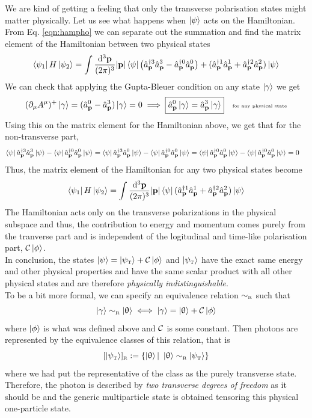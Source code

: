 We are kind of getting a feeling that only the transverse polarisation states might matter physically. Let us see what happens when $\ket{\psi}$ acts on the Hamiltonian. 
From Eq. \ref{eqn:hampho} we can separate out the summation and find the matrix element of the Hamiltonian between two physical states
\begin{align*}
    \bra{\psi_1} H\ket{\psi_2} = \int \frac{\dd^3\vb{{\vb{p}}}}{(2\pi)^3}|\vb{p}| \bra{\psi}{\qty(\hat{a}_{\vb{p}}^{\dagger3} \hat{a}_{\vb{p}}^{3} -\hat{a}_{\vb{p}}^{\dagger0} \hat{a}_{\vb{p}}^{0} ) +(\hat{a}_{\vb{p}}^{\dagger1} \hat{a}_{\vb{p}}^{1}+\hat{a}_{\vb{p}}^{\dagger2} \hat{a}_{\vb{p}}^{2})}\ket{\psi}
\end{align*} 
We can check that applying the Gupta-Bleuer condition on any state $\ket{\gamma}$ we get
$$(\partial_\mu A^\mu)^+ \ket{\gamma} = (\hat{a}_{\vb{p}}^{0} -\hat{a}_{\vb{p}}^{3} )\ket{\gamma} =0\implies \boxed{\hat{a}_{\vb{p}}^{0}\ket{\gamma } = \hat{a}_{\vb{p}}^{3}\ket{\gamma}} \quad \text{\tiny for any physical state}$$
Using this on the matrix element for the Hamiltonian above, we get that for the non-transverse part,
\begin{align*}
    \bra{\psi} \hat{a}_{\vb{p}}^{\dagger3} \hat{a}_{\vb{p}}^{3}\ket{\psi} -\bra{\psi}\hat{a}_{\vb{p}}^{\dagger0} \hat{a}_{\vb{p}}^{0}\ket{\psi} &= \bra{\psi} \hat{a}_{\vb{p}}^{\dagger3} \hat{a}_{\vb{p}}^{0}\ket{\psi} -\bra{\psi}\hat{a}_{\vb{p}}^{\dagger0} \hat{a}_{\vb{p}}^{0}\ket{\psi} = \bra{\psi} \hat{a}_{\vb{p}}^{\dagger0} \hat{a}_{\vb{p}}^{0}\ket{\psi} -\bra{\psi}\hat{a}_{\vb{p}}^{\dagger0} \hat{a}_{\vb{p}}^{0}\ket{\psi} =0
\end{align*}
Thus, the matrix element of the Hamiltonian for any two physical states become
$$\bra{\psi_1} H\ket{\psi_2} = \int \frac{\dd^3\vb{{\vb{p}}}}{(2\pi)^3}|\vb{p}| \bra{\psi}{ (\hat{a}_{\vb{p}}^{\dagger1} \hat{a}_{\vb{p}}^{1}+\hat{a}_{\vb{p}}^{\dagger2} \hat{a}_{\vb{p}}^{2})}\ket{\psi}$$
The Hamiltonian acts only on the transverse polarizations in the physical subspace and thus, the contribution to energy and momentum comes purely from the tranverse part and is independent of the logitudinal and time-like polarisation part, $\mathcal C \ket{\phi}$.\\[0.2cm]
In conclusion, the states $\ket{\psi} =\ket{\psi_{\text{\tiny T}}} + \mathcal C \ket{\phi}$ and $\ket{\psi_{\text{\tiny T}}}$ have the exact same energy and other physical properties and have the same scalar product with all other physical states and are therefore \textit{physically indistinguishable}. \\[0.2cm]
To be a bit more formal, we can specify an equivalence relation $\sim_{\text{\tiny R}}$ such that 
$$\ket{\gamma}\sim_{\text{\tiny R}} \ket{\uptheta} \iff \ket{\gamma} = \ket{\uptheta}+ \mathcal C\ket{\phi}$$
where $\ket{\phi}$ is what was defined above and $\mathcal C$ is some constant. Then photons are represented by the equivalence classes of this relation, that is
$$[\ket{\psi_{\text{\tiny T}}}]_{\text{\tiny R}} := \{ \ket{\uptheta}|\  \ket{\uptheta} \sim_{\text{\tiny R}}\ket{\psi_{\text{\tiny T}}}\}$$
where we had put the representative of the class as the purely transverse state. Therefore, the photon is described by \textit{two transverse degrees of freedom} as it should be and the generic multiparticle state is obtained tensoring this
physical one-particle state.
